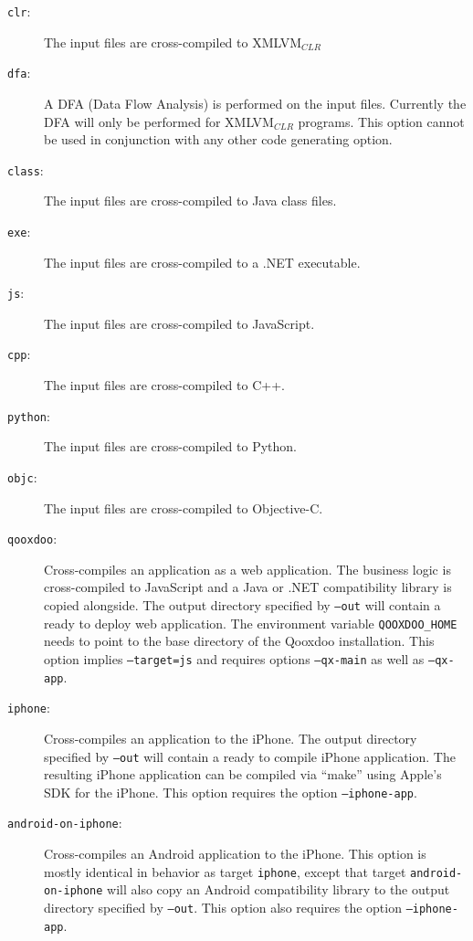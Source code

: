 \documentclass[11pt]{book}
\begin{document}
\begin{description}
\begin{description}
\item[\texttt{clr}:] The input files are cross-compiled to
  XMLVM$_{CLR}$

\item[\texttt{dfa}:] A DFA (Data Flow Analysis) is performed on the
  input files. Currently the DFA will only be performed for
  XMLVM$_{CLR}$ programs. This option cannot be used in conjunction
  with any other code generating option.

\item[\texttt{class}:] The input files are cross-compiled to Java
  class files.

\item[\texttt{exe}:] The input files are cross-compiled to a .NET
  executable.

\item[\texttt{js}:] The input files are cross-compiled to JavaScript.

\item[\texttt{cpp}:] The input files are cross-compiled to C++.

\item[\texttt{python}:] The input files are cross-compiled to Python.

\item[\texttt{objc}:] The input files are cross-compiled to
  Objective-C.

\item[\texttt{qooxdoo}:] Cross-compiles an application as a web
  application. The business logic is cross-compiled to JavaScript
  and a Java or .NET compatibility library is copied alongside.
  The output directory specified by \texttt{--out} will contain a
  ready to deploy web application.
  The environment variable \texttt{QOOXDOO\_HOME} needs to point to the
  base directory of the Qooxdoo \cite{qooxdoo} installation.
  This option implies \texttt{--target=js} and requires options
  \texttt{--qx-main} as well as \texttt{--qx-app}.

\item[\texttt{iphone}:] Cross-compiles an application to the iPhone.
  The output directory specified by \texttt{--out} will contain a
  ready to compile iPhone application.  The resulting iPhone
  application can be compiled via ``make'' using Apple's SDK for the
  iPhone. This option requires the option \texttt{--iphone-app}.

\item[\texttt{android-on-iphone}:] Cross-compiles an Android
  application to the iPhone.  This option is mostly identical in
  behavior as target \texttt{iphone}, except that target
  \texttt{android-on-iphone} will also copy an Android compatibility
  library to the output directory specified by \texttt{--out}. This
  option also requires the option \texttt{--iphone-app}.
\end{description}


\end{description}
\end{document}
